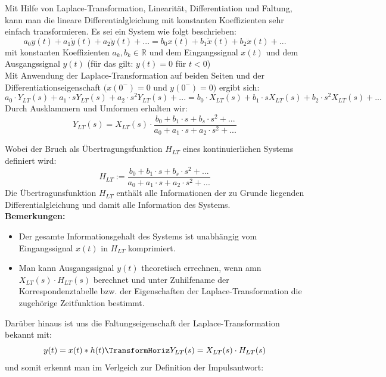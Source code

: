 \documentclass[12pt,a4paper]{scrartcl}
\begin{document}
  \noindent Mit Hilfe von Laplace-Transformation, Linearität, Differentiation und Faltung, kann man die lineare Differentialgleichung mit konstanten Koeffizienten sehr einfach transformieren. 
  Es sei ein System wie folgt beschrieben:
  $$ a_0 y(t) + a_1\dot{y}(t) + a_2\ddot{y}(t)+... = b_0 x(t) + b_1\dot{x}(t) + b_2\ddot{x}(t)+...$$
  mit konstanten Koeffizienten $a_k, b_k \in \mathbb{R}$ und dem Eingangssignal $x(t)$ und dem Ausgangssignal $y(t)$ (für das gilt: $y(t) = 0$ für $t<0$) \\
  Mit Anwendung der Laplace-Transformation auf beiden Seiten und der Differentiationseigenschaft $\big(x(0^-) = 0$ und $y(0^-) = 0\big)$ ergibt sich:
  $$ a_0\cdot Y_{LT}(s) + a_1\cdot sY_{LT}(s) + a_2 \cdot s^2 Y_{LT}(s) + ... = b_0\cdot X_{LT}(s) + b_1\cdot sX_{LT}(s) + b_2\cdot s^2 X_{LT}(s) + ...$$
  Durch Ausklammern und Umformen erhalten wir:
  \begin{equation}
    \label{eq:34}
    Y_{LT}(s) = X_{LT}(s) \cdot \frac{b_0 + b_1\cdot s + b_s\cdot s^2 + ...}{a_0 + a_1\cdot s + a_2 \cdot s^2 + ...}
  \end{equation}

  \noindent Wobei der Bruch als Übertragungsfunktion $H_{LT}$ eines kontinuierlichen Systems definiert wird:
  \begin{equation}
    \label{eq:35}
    H_{LT} := \frac{b_0 + b_1\cdot s + b_s\cdot s^2 + ...}{a_0 + a_1\cdot s + a_2 \cdot s^2 + ...}
  \end{equation}
  \noindent Die Übertragunsfunktion $H_{LT}$ enthält alle Informationen der zu Grunde liegenden Differentialgleichung und damit alle Information des Systems.\\

  \noindent \textbf{Bemerkungen:}
  \begin{itemize}
    \item Der gesamte Informationsgehalt des Systems ist unabhängig vom Eingangssignal $x(t)$ in $H_{LT}$ komprimiert.
    \item Man kann Ausgangssignal $y(t)$ theoretisch errechnen, wenn amn $X_{LT}(s) \cdot H_{LT}(s)$ berechnet und unter Zuhilfename der Korrespondenztabelle bzw. der Eigenschaften der Laplace-Transformation die zugehörige Zeitfunktion bestimmt.
  \end{itemize} 

  \noindent Darüber hinaus ist uns die Faltungseigenschaft der Laplace-Transformation bekannt mit:
  $$ y(t) = x(t) * h(t) \TransformHoriz Y_{LT}(s) = X_{LT}(s) \cdot H_{LT}(s)$$
  und somit erkennt man im Verlgeich zur Definition der Impulsantwort:
\end{document}
